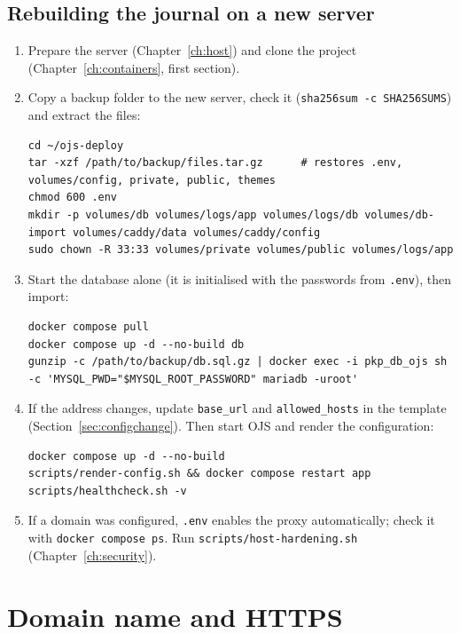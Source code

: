 \documentclass[11pt,a4paper]{report}
\newcommand{\code}[1]{\texttt{\small #1}}
\newcommand{\file}[1]{\texttt{\small #1}}
\begin{document}
\section{Rebuilding the journal on a new server}\label{sec:newserver}
\begin{enumerate}
  \item Prepare the server (Chapter~\ref{ch:host}) and clone the project (Chapter~\ref{ch:containers}, first section).
  \item Copy a backup folder to the new server, check it (\code{sha256sum -c SHA256SUMS}) and extract the files:
\begin{lstlisting}
cd ~/ojs-deploy
tar -xzf /path/to/backup/files.tar.gz      # restores .env, volumes/config, private, public, themes
chmod 600 .env
mkdir -p volumes/db volumes/logs/app volumes/logs/db volumes/db-import volumes/caddy/data volumes/caddy/config
sudo chown -R 33:33 volumes/private volumes/public volumes/logs/app
\end{lstlisting}
  \item Start the database alone (it is initialised with the passwords from \file{.env}), then import:
\begin{lstlisting}
docker compose pull
docker compose up -d --no-build db
gunzip -c /path/to/backup/db.sql.gz | docker exec -i pkp_db_ojs sh -c 'MYSQL_PWD="$MYSQL_ROOT_PASSWORD" mariadb -uroot'
\end{lstlisting}
  \item If the address changes, update \code{base\_url} and \code{allowed\_hosts} in the template
        (Section~\ref{sec:configchange}). Then start OJS and render the configuration:
\begin{lstlisting}
docker compose up -d --no-build
scripts/render-config.sh && docker compose restart app
scripts/healthcheck.sh -v
\end{lstlisting}
  \item If a domain was configured, \file{.env} enables the proxy automatically; check it with
        \code{docker compose ps}. Run \file{scripts/host-hardening.sh} (Chapter~\ref{ch:security}).
\end{enumerate}

\chapter{Domain name and HTTPS}\label{ch:domain}
\end{document}
